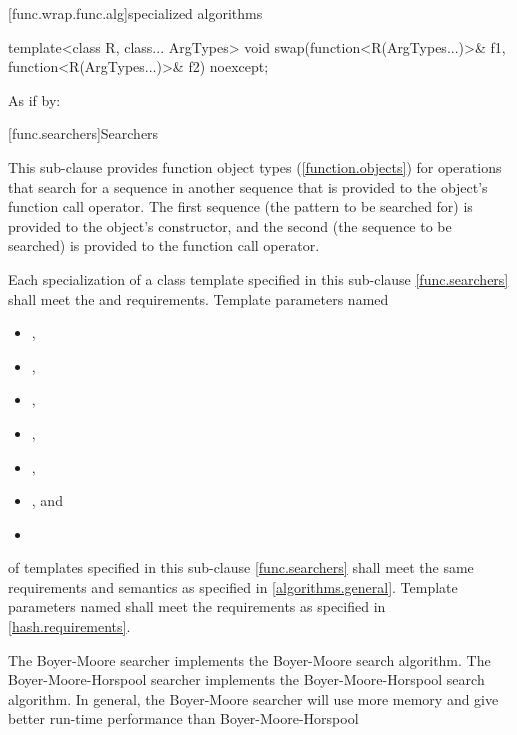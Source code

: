 [func.wrap.func.alg]{specialized algorithms}

%
\begin{itemdecl}
template<class R, class... ArgTypes>
  void swap(function<R(ArgTypes...)>& f1, function<R(ArgTypes...)>& f2) noexcept;
\end{itemdecl}

\begin{itemdescr}
\pnum\effects As if by: 
\end{itemdescr}%

[func.searchers]{Searchers}

\pnum
This sub-clause provides function object types (\ref{function.objects}) for
operations that search for a sequence  in another
sequence  that is provided to the object's function call
operator.  The first sequence (the pattern to be searched for) is provided to
the object's constructor, and the second (the sequence to be searched) is
provided to the function call operator.

\pnum
Each specialization of a class template specified in this sub-clause \ref{func.searchers} shall meet the  and  requirements.
Template parameters named
\begin{itemize}
\item {},
\item {},
\item {},
\item {},
\item {},
\item {}, and
\item {}
\end{itemize}
of templates specified in this sub-clause
\ref{func.searchers} shall meet the same requirements and semantics as
specified in \ref{algorithms.general}.
Template parameters named  shall meet the requirements as specified in \ref{hash.requirements}.

\pnum
The Boyer-Moore searcher implements the Boyer-Moore search algorithm.
The Boyer-Moore-Horspool searcher implements the Boyer-Moore-Horspool search algorithm.
In general, the Boyer-Moore searcher will use more memory and give better run-time performance than Boyer-Moore-Horspool

